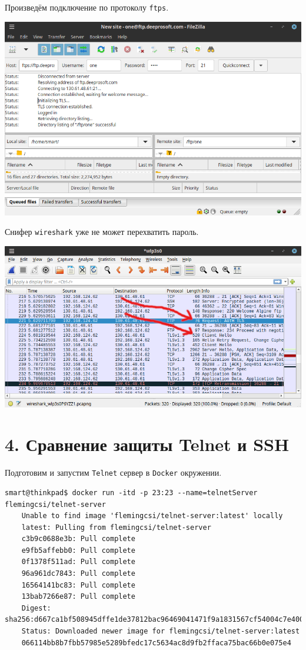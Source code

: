 \newpage

Произведём подключение по протоколу \texttt{ftps}.
\begin{center}
    \includegraphics[scale=0.55]{res/5.filezilla-ftps.png}
\end{center}

Снифер \texttt{wireshark} уже не может перехватить пароль.
\begin{center}
    \includegraphics[scale=0.55]{res/5.wireshark-ftps.png}
\end{center}

\newpage

\section*{4. Сравнение защиты Telnet и SSH}

Подготовим и запустим \texttt{Telnet} сервер в \texttt{Docker} окружении.
\begin{Verbatim}[frame=single,breaklines=true,breakanywhere=true]
    smart@thinkpad$ docker run -itd -p 23:23 --name=telnetServer flemingcsi/telnet-server
    Unable to find image 'flemingcsi/telnet-server:latest' locally
    latest: Pulling from flemingcsi/telnet-server
    c3b9c0688e3b: Pull complete 
    e9fb5affebb0: Pull complete 
    0f1378f511ad: Pull complete 
    96a961dc7843: Pull complete 
    16564141bc83: Pull complete 
    13bab7266e87: Pull complete 
    Digest: sha256:d667ca1bf508945dffe1de37812bac96469041471f9a1831567cf54004c7e400
    Status: Downloaded newer image for flemingcsi/telnet-server:latest
    066114bb8b7fbb57985e5289bfedc17c5634ac8d9fb2ffaca75bac66b0e075e4
\end{Verbatim}

